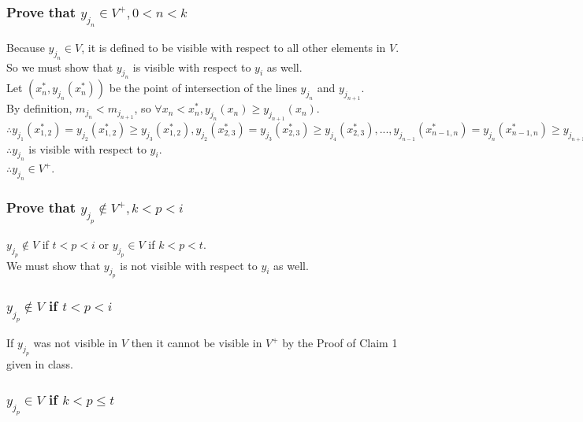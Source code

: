 \documentclass{article}
\begin{document}
\subsubsection*{Prove that $y_{j_n} \in V^+, 0 < n < k$}
Because $y_{j_n} \in V$, it is defined to be visible with respect to all other elements in $V$.\\
So we must show that $y_{j_n}$ is visible with respect to $y_i$ as well.\\
Let $(x^*_n, y_{j_n}(x^*_n))$ be the point of intersection of the lines $y_{j_n}$ and $y_{j_{n+1}}$.\\
By definition, $m_{j_n} < m_{j_{n+1}}$, so $\forall x_n < x^*_n, y_{j_n} (x_n) \geq y_{j_{n+1}} (x_n)$.\\
$\therefore y_{j_{1}}(x^*_{1,2}) = y_{j_{2}}(x^*_{1,2}) \geq y_{j_3}(x^*_{1,2}), y_{j_{2}}(x^*_{2,3}) = y_{j_{3}}(x^*_{2,3}) \geq y_{j_4}(x^*_{2,3}), ..., y_{j_{n-1}}(x^*_{n-1,n}) = y_{j_{n}}(x^*_{n-1,n}) \geq y_{j_{n+1}}(x^*_{n-1,n}), ..., y_{j_{k-1}}(x^*_{k-1,k}) = y_{j_{k}}(x^*_{k-1,k}) \geq y_{j_{i}}(x^*_{k-1,k})$\\
$\therefore y_{j_n}$ is visible with respect to $y_i$.\\
$\therefore y_{j_n} \in V^+$.

\subsubsection*{Prove that $y_{j_p} \notin V^+, k < p < i$}
$y_{j_p} \notin V$ if $t < p < i$ or $y_{j_p} \in V$ if $k < p < t$.\\
We must show that $y_{j_p}$ is not visible with respect to $y_i$ as well.

\subsubsection{$y_{j_p} \notin V$ if $t < p < i$}
If $y_{j_p}$ was not visible in $V$ then it cannot be visible in $V^+$ by the Proof of Claim 1 given in class.

\subsubsection{$y_{j_p} \in V$ if $k < p \leq t$}
\end{document}
